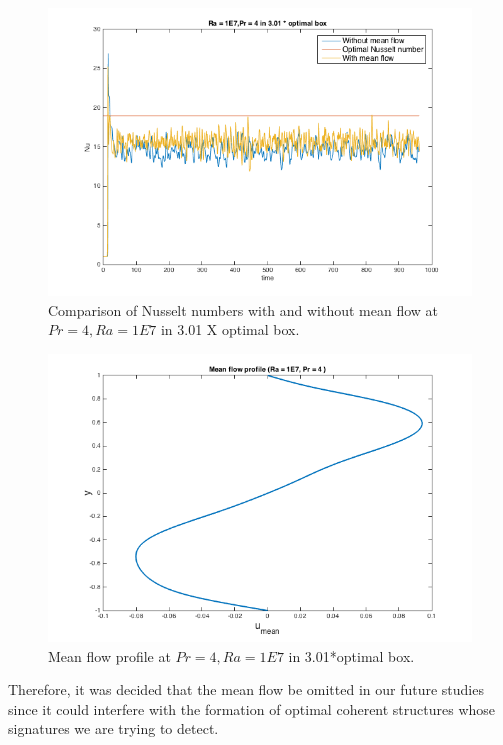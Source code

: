 \documentclass[12pt]{article}
\begin{document}
     \begin{figure}[!htb]
     	\includegraphics[width=\linewidth]{Nu1E74301opt.png}
     	\caption{Comparison of Nusselt numbers with and without mean flow at $Pr = 4, Ra = 1E7$ in 3.01 X optimal box.}
     	\label{fig:fig1}
     \end{figure}
     
     \begin{figure}[!htb]
     	\includegraphics[width=\linewidth]{umean.png}
     	\caption{Mean flow profile at $Pr = 4, Ra = 1E7$ in 3.01*optimal box.}
     	\label{fig:fig2}
     \end{figure}
     
     Therefore, it was decided that the mean flow be omitted in our future studies since it could interfere with the formation of optimal coherent structures whose signatures we are trying to detect.
     
\end{document}
